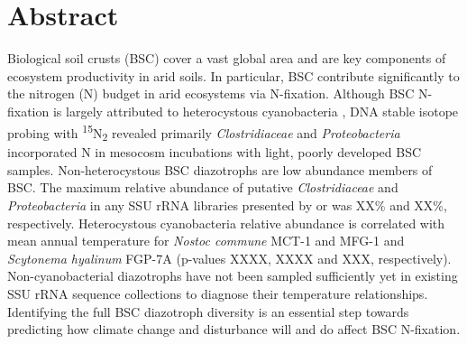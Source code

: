 \section{Abstract}
Biological soil crusts (BSC) cover a vast global area and are key components of ecosystem productivity in arid soils. In particular, BSC contribute significantly to the nitrogen (N) budget in arid ecosystems via N-fixation. Although BSC N-fixation is largely attributed to heterocystous cyanobacteria \cite{Yeager, 14766579, Yeager_2012}, DNA stable isotope probing with \textsuperscript{15}N\textsubscript{2} revealed primarily \textit{Clostridiaceae} and \textit{Proteobacteria} incorporated N in mesocosm incubations with light, poorly developed BSC samples. Non-heterocystous BSC diazotrophs are low abundance members of BSC. The maximum relative abundance of putative \textit{Clostridiaceae} and \textit{Proteobacteria} in any SSU rRNA libraries presented by \citet{Garcia_Pichel_2013} or \citet{Steven_2013} was XX\% and XX\%, respectively. Heterocystous cyanobacteria relative abundance is correlated with mean annual temperature for \textit{Nostoc commune} MCT-1 and MFG-1 and \textit{Scytonema hyalinum} FGP-7A (p-values XXXX, XXXX and XXX, respectively). Non-cyanobacterial diazotrophs have not been sampled sufficiently yet in existing SSU rRNA sequence collections to diagnose their temperature relationships. Identifying the full BSC diazotroph diversity is an essential step towards predicting how climate change and disturbance will and do affect BSC N-fixation.